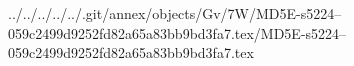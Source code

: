 ../../../../../.git/annex/objects/Gv/7W/MD5E-s5224--059c2499d9252fd82a65a83bb9bd3fa7.tex/MD5E-s5224--059c2499d9252fd82a65a83bb9bd3fa7.tex